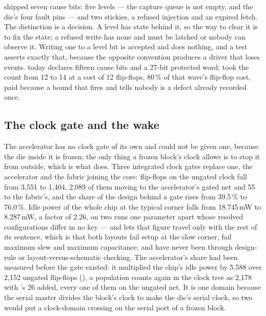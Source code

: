  shipped seven cause bits: five levels --- the capture
queue is not empty, and the die's four fault pins --- and two stickies,
a refused injection and an expired fetch. The distinction is a
decision. A level has state behind it, so the way to clear it is to fix
the state; a refused write has none and must be latched or nobody can
observe it. Writing one to a level bit is accepted and does nothing,
and a test asserts exactly that, because the opposite convention
produces a driver that loses events.
 today declares fifteen cause
bits and a 27-bit protected word;  took the
count from 12 to 14 at a cost of 12 flip-flops, 80\,\% of that wave's
flip-flop cost, paid because a bound that fires and tells nobody is a
defect already recorded once.

\subsection{The clock gate and the wake}

The accelerator has no clock gate of its own and could not be given
one, because the die inside it is frozen; the only thing a frozen
block's clock allows is to stop it from outside, which is what
 does. Three integrated clock gates replace one, the
accelerator and the fabric joining the core: flip-flops on the ungated
clock fall from 3,551 to 1,404, 2,089 of them moving to the
accelerator's gated net and 55 to the fabric's, and the share of the
design behind a gate rises from 39.5\,\% to 76.0\,\%. Idle power of the
whole chip at the typical corner falls from 18.745\,mW to 8.287\,mW, a
factor of 2.26, on two runs one parameter apart whose resolved
configurations differ in no key --- and  lets
that figure travel only with the rest of its sentence, which is that
both layouts fail setup at the slow corner, fail maximum slew and
maximum capacitance, and have never been through design-rule or
layout-versus-schematic checking. The accelerator's share had been
measured before the gate existed: it multiplied the chip's idle power
by 5.588 over 2,152 ungated flip-flops (), a
population  counts again in the clock tree as
2,178 with 's 26 added, every one of them on the ungated
net. It is one domain
because the serial master divides the block's clock to make the die's
serial clock, so two would put a clock-domain crossing on the serial
port of a frozen block.

